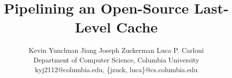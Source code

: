 \documentclass{sig-alternate}
\begin{document}
\title{Pipelining an Open-Source Last-Level Cache}

\author{
Kevin Yunchuan Jiang \qquad Joseph Zuckerman \qquad Luca P. Carloni \\
Department of Computer Science, Columbia University \\
kyj2112@columbia.edu, \{jzuck, luca\}@cs.columbia.edu 
}

\vspace{-2cm}

\maketitle

\vspace{-2cm}



\pagebreak


\end{document}
